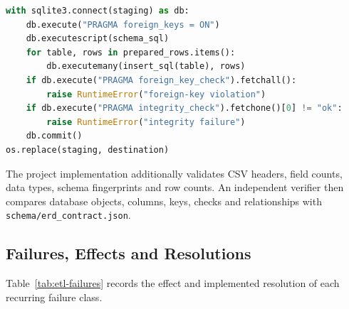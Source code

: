 \begin{lstlisting}[language=Python,caption={Core guarded load used by the database builder},
label={lst:etl-load}]
with sqlite3.connect(staging) as db:
    db.execute("PRAGMA foreign_keys = ON")
    db.executescript(schema_sql)
    for table, rows in prepared_rows.items():
        db.executemany(insert_sql(table), rows)
    if db.execute("PRAGMA foreign_key_check").fetchall():
        raise RuntimeError("foreign-key violation")
    if db.execute("PRAGMA integrity_check").fetchone()[0] != "ok":
        raise RuntimeError("integrity failure")
    db.commit()
os.replace(staging, destination)
\end{lstlisting}

The project implementation additionally validates CSV headers, field counts,
data types, schema fingerprints and row counts. An independent verifier then
compares database objects, columns, keys, checks and relationships with
\texttt{schema/erd\_contract.json}.

\subsection{Failures, Effects and Resolutions}
\label{subsec:etl-failures}

Table~\ref{tab:etl-failures} records the effect and implemented resolution of
each recurring failure class.

